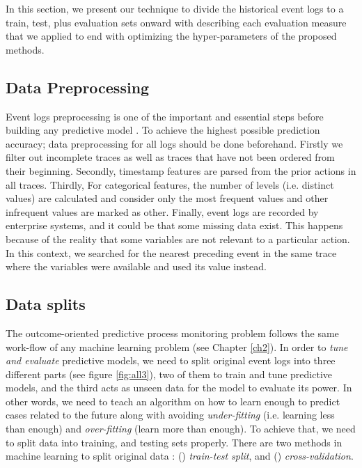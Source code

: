 In this section, we present our technique to divide the historical event logs to a train, test, plus evaluation sets onward with describing each evaluation measure that we applied to end with optimizing the hyper-parameters of the proposed methods. 

\subsection{ Data Preprocessing}
Event logs preprocessing is one of the important and essential steps before building any predictive model \cite{kotsiantis2006data}. To achieve the highest possible prediction accuracy; data preprocessing for all logs should be done beforehand. Firstly we filter out incomplete traces as well as traces that have not been ordered from their beginning.  Secondly, timestamp features are parsed from the prior actions in all traces. Thirdly, For categorical features, the number of levels (i.e. distinct values) are calculated and consider only the most frequent values and other infrequent values are marked as other. Finally, event logs are recorded by enterprise systems, and it could be that some missing data exist. This happens because of the reality that some variables are not relevant to a particular action. In this context, we searched for the nearest preceding event in the same trace where the variables were available and used its value instead.


\subsection{Data splits}
The outcome-oriented predictive process monitoring problem follows the same work-flow of any machine learning problem (see Chapter \ref{ch2}). In order to \textit{tune and evaluate} predictive models, we need to split original event logs into three different parts (see figure \ref{fig:all3}), two of them to train and tune predictive models, and the third acts as unseen data for the model to evaluate its power. In other words, we need to teach an algorithm on how to learn enough to predict cases related to the future along with avoiding \textit{under-fitting} (i.e. learning less than enough)  and \textit{over-fitting} (learn more than enough).  To achieve that, we need to split data into training, and testing sets properly.  There are two methods in machine learning to split original data \cite{mitchell1997machine}: () \textit{train-test split}, and () \textit{cross-validation}.

